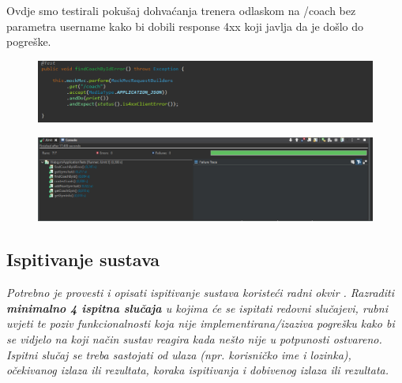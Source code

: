 				
			\noindent {}
			
			 Ovdje smo testirali pokušaj dohvaćanja trenera odlaskom na /coach bez parametra username kako bi dobili response 4xx koji javlja da je došlo do pogreške.
			\begin{figure}[H]
    			\hspace*{-1.5cm}
    			\includegraphics[scale=0.5]{slike/findCoachByError.PNG} %
    			\centering
    			\label{fig:promjene}
    	    \end{figure}
	

				
			\noindent {}

			\begin{figure}[H]
    			\hspace*{-1.5cm}
    			\includegraphics[scale=0.5]{slike/rezultati.PNG} %
    			\centering
    			\label{fig:promjene}
    	    \end{figure}
	

			\subsection{Ispitivanje sustava}
			
			 \textit{Potrebno je provesti i opisati ispitivanje sustava koristeći radni okvir . Razraditi \textbf{minimalno 4 ispitna slučaja} u kojima će se ispitati redovni slučajevi, rubni uvjeti te poziv funkcionalnosti koja nije implementirana/izaziva pogrešku kako bi se vidjelo na koji način sustav reagira kada nešto nije u potpunosti ostvareno. Ispitni slučaj se treba sastojati od ulaza (npr. korisničko ime i lozinka), očekivanog izlaza ili rezultata, koraka ispitivanja i dobivenog izlaza ili rezultata.\\ }
			 

